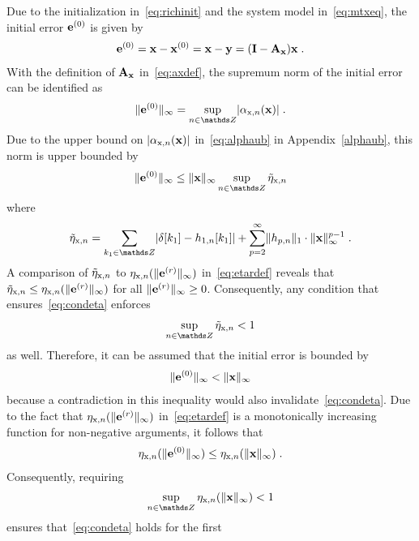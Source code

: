 \documentclass[10pt,twocolumn,twoside]{IEEEtran}
\begin{document}
Due to the initialization in~\eqref{eq:richinit} and the system model in~\eqref{eq:mtxeq},
the initial error $\bm{\mathrm{e}}^{(0)}$ is given by
\begin{align*}
	\bm{\mathrm{e}}^{(0)} = \bm{\mathrm{x}} - \bm{\mathrm{x}}^{(0)}
	             = \bm{\mathrm{x}} - \bm{\mathrm{y}}
	             = (\bm{\mathrm{I}} - \bm{\mathrm{A}}_{\bm{\mathrm{x}}})\bm{\mathrm{x}}\;.
\end{align*}
With the definition of $\bm{\mathrm{A}}_{\bm{\mathrm{x}}}$ in~\eqref{eq:axdef}, the supremum norm
of the initial error can be identified as
\begin{align*}
	\norminf{\vm{e}^{(0)}} = \sup_{n\in\Z} \abs{\salpha{x}{n}(\vm{x})}\;.
\end{align*}
Due to the upper bound on $\lvert\alpha_{\mathrm{x},n}(\bm{\mathrm{x}})\rvert$ in~\eqref{eq:alphaub}
in Appendix~\ref{alphaub}, this norm is upper bounded by
\begin{align*}
	\norminf{\vm{e}^{(0)}} \leq
	\norminf{\vm{x}} \sup_{n\in\Z} \setatilde{x}{n}
\end{align*}
where
\begin{align*}
	\setatilde{x}{n} = \sum_{k_1\in\Z} \abs{\delta[k_1]-h_{1,n}[k_1]}
			+ \sum_{p=2}^\infty \normone{h_{p,n}} \cdot \norminf{\vm{x}}^{p-1}\;.
\end{align*}
A comparison of $\tilde{\eta}_{\mathrm{x},n}$ to $\eta_{\mathrm{x},n}(\lVert\bm{\mathrm{e}}^{(r)}\rVert_\infty)$
in~\eqref{eq:etardef} reveals that $\tilde{\eta}_{\mathrm{x},n}\leq \eta_{\mathrm{x},n}(\lVert\bm{\mathrm{e}}^{(r)}\rVert_\infty)$
for all $\lVert\bm{\mathrm{e}}^{(r)}\rVert_\infty\geq 0$. Consequently, any condition that ensures~\eqref{eq:condeta}
enforces
\begin{align*}
	\sup_{n\in\Z} \setatilde{x}{n} < 1
\end{align*}
as well. Therefore, it can be assumed that the initial error is bounded by
\begin{align}
	\lVert\bm{\mathrm{e}}^{(0)}\rVert_\infty < \lVert\bm{\mathrm{x}}\rVert_\infty
	\label{eq:e0ltx}
\end{align}
because a contradiction in this inequality would also invalidate~\eqref{eq:condeta}.
Due to the fact that $\eta_{\mathrm{x},n}(\lVert\bm{\mathrm{e}}^{(r)}\rVert_\infty)$ in~\eqref{eq:etardef}
is a monotonically increasing function for non-negative arguments, it follows
that
\begin{align}
	\eta_{\mathrm{x},n}(\lVert\bm{\mathrm{e}}^{(0)}\rVert_\infty) \leq \eta_{\mathrm{x},n}(\lVert\bm{\mathrm{x}}\rVert_\infty)\;.
	\label{eq:etaxne0ltetaxnx}
\end{align}
Consequently, requiring
\begin{align}
	\sup_{n\in\Z} \seta{x}{n}(\norminf{\vm{x}}) < 1
	\label{eq:supetaxnlt1}
\end{align}
ensures that~\eqref{eq:condeta} holds for the first
\end{document}
